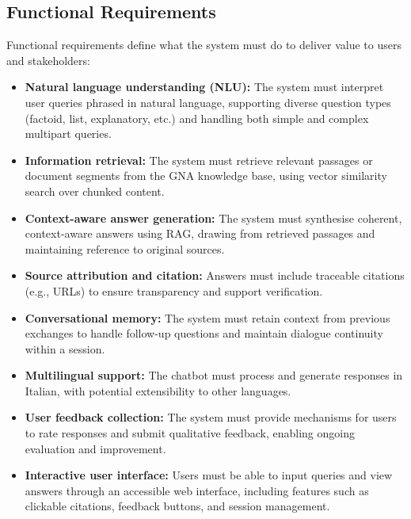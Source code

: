 \begin{spacing}{1.5}
\subsection{Functional Requirements}
Functional requirements define what the system must do to deliver value to users and stakeholders:
\begin{itemize}
    \item \textbf{Natural language understanding (NLU):} The system must interpret user queries phrased in natural language, supporting diverse question types (factoid, list, explanatory, etc.) and handling both simple and complex multipart queries.
    \item \textbf{Information retrieval:} The system must retrieve relevant passages or document segments from the GNA knowledge base, using vector similarity search over chunked content.
    \item \textbf{Context-aware answer generation:} The system must synthesise coherent, context-aware answers using RAG, drawing from retrieved passages and maintaining reference to original sources.
    \item \textbf{Source attribution and citation:} Answers must include traceable citations (e.g., URLs) to ensure transparency and support verification.
    \item \textbf{Conversational memory:} The system must retain context from previous exchanges to handle follow-up questions and maintain dialogue continuity within a session.
    \item \textbf{Multilingual support:} The chatbot must process and generate responses in Italian, with potential extensibility to other languages.
    \item \textbf{User feedback collection:} The system must provide mechanisms for users to rate responses and submit qualitative feedback, enabling ongoing evaluation and improvement.
    \item \textbf{Interactive user interface:} Users must be able to input queries and view answers through an accessible web interface, including features such as clickable citations, feedback buttons, and session management.
\end{itemize}


\end{spacing}

